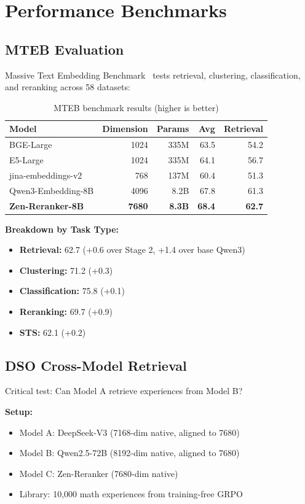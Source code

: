 \section{Performance Benchmarks}


\subsection{MTEB Evaluation}

Massive Text Embedding Benchmark~\cite{muennighoff2023mteb} tests retrieval, clustering, classification, and reranking across 58 datasets:

\begin{table}[h]
\centering
\caption{MTEB benchmark results (higher is better)}
\begin{tabular}{lrrrr}
\toprule
\textbf{Model} & \textbf{Dimension} & \textbf{Params} & \textbf{Avg} & \textbf{Retrieval} \\
\midrule
BGE-Large & 1024 & 335M & 63.5 & 54.2 \\
E5-Large & 1024 & 335M & 64.1 & 56.7 \\
jina-embeddings-v2 & 768 & 137M & 60.4 & 51.3 \\
Qwen3-Embedding-8B & 4096 & 8.2B & 67.8 & 61.3 \\
\textbf{Zen-Reranker-8B} & \textbf{7680} & \textbf{8.3B} & \textbf{68.4} & \textbf{62.7} \\
\bottomrule
\end{tabular}
\end{table}

\textbf{Breakdown by Task Type:}
\begin{itemize}
\item \textbf{Retrieval:} 62.7 (+0.6 over Stage 2, +1.4 over base Qwen3)
\item \textbf{Clustering:} 71.2 (+0.3)
\item \textbf{Classification:} 75.8 (+0.1)
\item \textbf{Reranking:} 69.7 (+0.9)
\item \textbf{STS:} 62.1 (+0.2)
\end{itemize}

\subsection{DSO Cross-Model Retrieval}

Critical test: Can Model A retrieve experiences from Model B?

\textbf{Setup:}
\begin{itemize}
\item Model A: DeepSeek-V3 (7168-dim native, aligned to 7680)
\item Model B: Qwen2.5-72B (8192-dim native, aligned to 7680)
\item Model C: Zen-Reranker (7680-dim native)
\item Library: 10,000 math experiences from training-free GRPO
\end{itemize}


